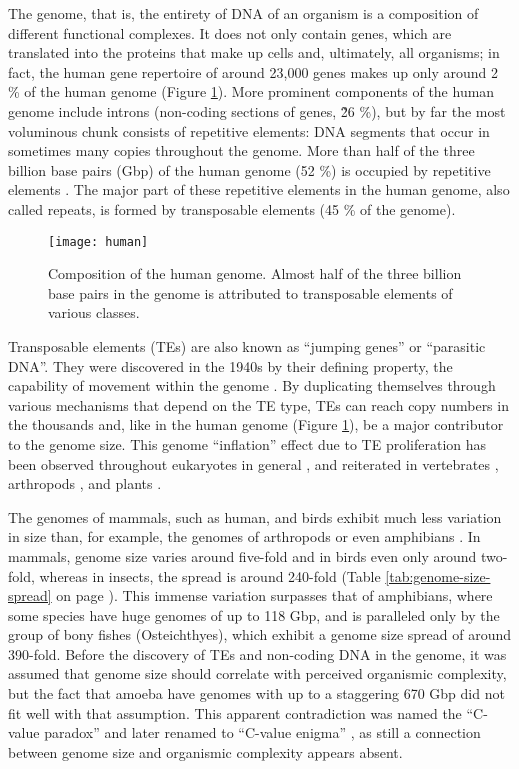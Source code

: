 The genome, that is, the entirety of DNA of an organism is a composition
of different functional complexes. It does not only contain genes, which
are translated into the proteins that make up cells and, ultimately, all
organisms; in fact, the human gene repertoire of around 23,000 genes
makes up only around 2 \% of the human genome \citep{Makalowski2001}
(Figure \ref{fig:human-genome}). More prominent components of the human
genome include introns (non-coding sections of genes, \~26 \%), but by
far the most voluminous chunk consists of repetitive elements: DNA
segments that occur in sometimes many copies throughout the genome.
More than half of the three billion base pairs (Gbp) of the human genome
(52 \%) is occupied by repetitive elements \citep{Lander2001}. The major
part of these repetitive elements in the human genome, also called
repeats, is formed by transposable elements (45 \% of the genome).

\begin{figure}
\centering
\texttt{[image: human]}
\caption{Composition of the human genome. Almost half of the three
billion base pairs in the genome is attributed to transposable elements
of various classes.}
\label{fig:human-genome}
\end{figure}

Transposable elements (TEs) are also known as ``jumping genes'' or
``parasitic DNA''. They were discovered in the 1940s by their defining
property, the capability of movement within the genome
\citep{McClintock1950}. By duplicating themselves through various
mechanisms that depend on the TE type, TEs can reach copy numbers in the
thousands \citep{Petersen2018} and, like in the human genome (Figure
\ref{fig:human-genome}), be a major contributor to the genome size. This
genome ``inflation'' effect due to TE proliferation has been observed
throughout eukaryotes in general \citep{Chenais2012}, and reiterated in
vertebrates \citep{Chalopin2015}, arthropods \citep{Petersen2018}, and
plants \citep{Staton2015}. 

The genomes of mammals, such as human, and birds exhibit much less
variation in size than, for example, the genomes of arthropods or even
amphibians \citep{Gregory2005}. In mammals, genome size varies around
five-fold and in birds even only around two-fold, whereas in insects,
the spread is around 240-fold (Table \ref{tab:genome-size-spread} on page
\pageref{tab:genome-size-spread}). This immense variation surpasses that
of amphibians, where some species have huge genomes of up to 118 Gbp, and
is paralleled only by the group of bony fishes (Osteichthyes), which
exhibit a genome size spread of around 390-fold. Before the discovery of
TEs and non-coding DNA in the genome, it was assumed that genome size
should correlate with perceived organismic complexity, but the fact that
amoeba have genomes with up to a staggering 670 Gbp \citep{Parfrey2008}
did not fit well with that assumption. This apparent contradiction was
named the ``C-value paradox'' and later renamed to ``C-value enigma''
\citep{Gregory2007}, as still a connection between genome size and
organismic complexity appears absent.

